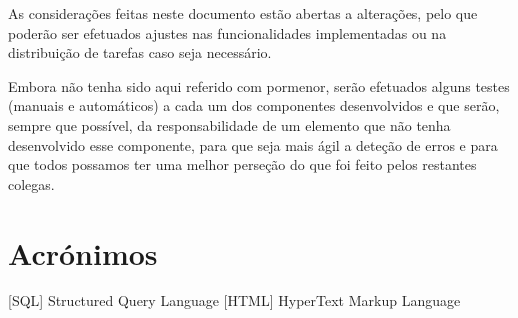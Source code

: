 \documentclass{report}
\begin{document}
As considerações feitas neste documento estão abertas a alterações, pelo que poderão ser efetuados ajustes nas funcionalidades implementadas ou na distribuição de tarefas caso seja necessário.

Embora não tenha sido aqui referido com pormenor, serão efetuados alguns testes (manuais e automáticos) a cada um dos componentes desenvolvidos e que serão, sempre que possível, da responsabilidade de um elemento que não tenha desenvolvido esse componente, para que seja mais ágil a deteção de erros e para que todos possamos ter uma melhor perseção do que foi feito pelos restantes colegas.


\chapter*{Acrónimos}
\begin{acronym}
[SQL] {Structured Query Language}
 [HTML] {HyperText Markup Language}

\end{acronym}


\printbibliography
\end{document}
